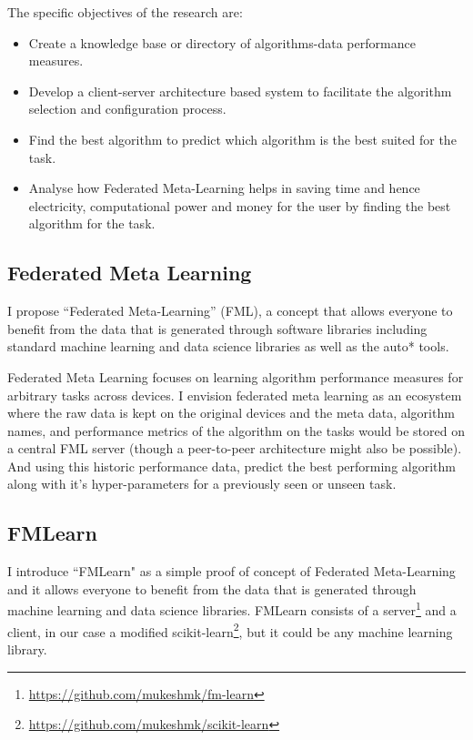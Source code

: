 The specific objectives of the research are:

\begin{itemize}
    \item Create a knowledge base or directory of algorithms-data performance measures.
    \item Develop a client-server architecture based system to facilitate the algorithm selection and configuration process.
    \item Find the best algorithm to predict which algorithm is the best suited for the task.
    \item Analyse how Federated Meta-Learning helps in saving time and hence electricity, computational power and money for the user by finding the best algorithm for the task.
\end{itemize}

\subsection{Federated Meta Learning}
I propose “Federated Meta-Learning” (FML), a concept that allows everyone to benefit from the data that is generated through software libraries including standard machine learning and data science libraries as well as the auto* tools. 

Federated Meta Learning focuses on learning algorithm performance measures for arbitrary tasks across devices. I envision federated meta learning as an ecosystem where the raw data is kept on the original  devices and the meta data, algorithm names, and performance metrics of the algorithm on the tasks would be stored on a central FML server (though a peer-to-peer architecture might also be possible). And using this historic performance data, predict the best performing algorithm along with it's hyper-parameters for a previously seen or unseen task.

\subsection{FMLearn}
I introduce “FMLearn" as a simple proof of concept of Federated Meta-Learning and it allows everyone to benefit from the data that is generated through machine learning and data science libraries. FMLearn consists of a server\footnote{\url{https://github.com/mukeshmk/fm-learn}} and a client, in our case a modified scikit-learn\footnote{\url{https://github.com/mukeshmk/scikit-learn}}, but it could be any machine learning library.

